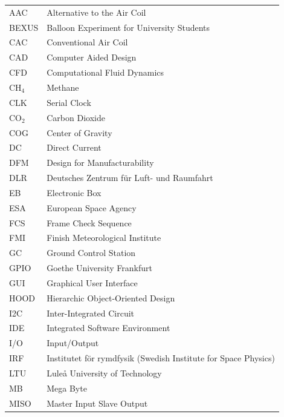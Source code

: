 \documentclass[a4paper,12pt,twoside]{article}
\begin{document}
  
    \begin{longtable}{p{3cm} p{9cm}}
            AAC         & Alternative to the Air Coil\\
            BEXUS       & Balloon Experiment for University Students\\
            CAC         & Conventional Air Coil\\
            CAD         & Computer Aided Design \\
            CFD         & Computational Fluid Dynamics\\
            CH$_{4}$    & Methane\\
            CLK         & Serial Clock\\
            CO$_{2}$    & Carbon Dioxide\\
            COG         & Center of Gravity \\
            DC          & Direct Current\\
            DFM         & Design for Manufacturability \\
            DLR         & Deutsches Zentrum f{\"u}r Luft- und Raumfahrt \\
            EB          & Electronic Box \\
            ESA         & European Space Agency \\
            FCS         & Frame Check Sequence\\
            FMI         & Finish Meteorological Institute\\
            GC          & Ground Control Station\\
            GPIO        & Goethe University Frankfurt\\
            GUI         & Graphical User Interface\\
            HOOD        & Hierarchic Object-Oriented Design\\
            I2C         & Inter-Integrated Circuit \\
            IDE         & Integrated Software Environment \\
            I/O         & Input/Output\\
            IRF         & Institutet för rymdfysik (Swedish Institute for Space Physics)\\
            LTU         & Luleå University of Technology \\
            MB          & Mega Byte\\
            MISO        & Master Input Slave Output\\

\end{longtable}
\end{document}

